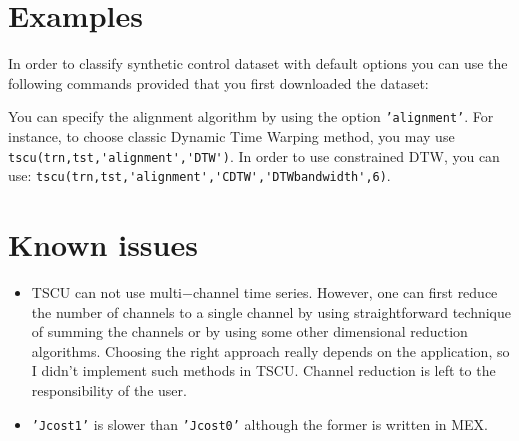 \documentclass{article}
\newcommand{\parametre}[1]{\texttt{#1}}
\newcommand{\matlabfile}[1]{}
\begin{document}
\section{Examples}
In order to classify synthetic control dataset with default options you can use the following commands provided that you first downloaded the dataset:
\begin{scriptsize}
\matlabfile{tscu_manual_verbatim04.out}
\end{scriptsize}

You can specify the alignment algorithm by using the option \parametre{'alignment'}. For instance, to choose classic Dynamic Time Warping method, you may use
\verb|tscu(trn,tst,'alignment','DTW')|.
In order to use constrained DTW, you can use:
\verb|tscu(trn,tst,'alignment','CDTW','DTWbandwidth',6)|.

\section{Known issues}
\begin{itemize}
\item%
TSCU can not use multi$-$channel time series. 
However, one can first reduce the number of channels to a single channel by using straightforward technique of summing the channels or by using some other dimensional reduction algorithms. 
Choosing the right approach really depends on the application, so I didn't implement such methods in TSCU.\@ 
Channel reduction is left to the responsibility of the user.
\item%
\parametre{'Jcost1'} is slower than \parametre{'Jcost0'} although the former is written in MEX.\@
\end{itemize}


\end{document}
